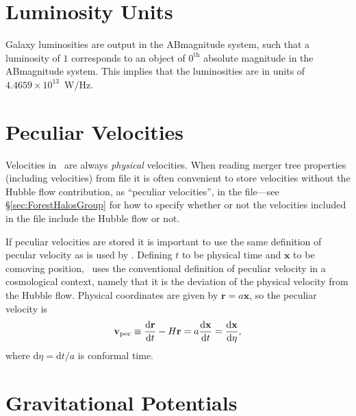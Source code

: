 \section{Luminosity Units}

Galaxy luminosities are output in the \gls{ABmagnitude} system, such that a luminosity of $1$ corresponds to an object of $0^\mathrm{th}$ absolute magnitude in the \gls{ABmagnitude} system. This implies that the luminosities are in units of $4.4659\times 10^{13}$~W/Hz.

\section{Peculiar Velocities}\label{sec:GalacticusVelocityDefinitions}

Velocities in \glc\ are always \emph{physical} velocities. When reading merger tree properties (including velocities) from file it is often convenient to store velocities without the Hubble flow contribution, as ``peculiar velocities'', in the file---see \S\ref{sec:ForestHalosGroup} for how to specify whether or not  the velocities included in the file include the Hubble flow or not.

If peculiar velocities are stored it is important to use the same definition of pecular velocity as is used by \glc. Defining $t$ to be physical time and $\mathbf{x}$ to be comoving position, \glc\ uses the conventional definition of peculiar velocity in a cosmological context, namely that it is the deviation of the physical velocity from the Hubble flow. Physical coordinates are given by $\mathbf{r} = a\mathbf{x}$, so the peculiar velocity is
\begin{equation}
\mathbf{v}_\mathrm{pec} \equiv {\mathrm{d} \mathbf{r} \over \mathrm{d} t} - H \mathbf{r} = a {\mathrm{d} \mathbf{x}\over\mathrm{d} t} = {\mathrm{d}\mathbf{x}\over\mathrm{d}\eta},
\end{equation}
where $\mathrm{d}\eta = \mathrm{d}t/a$ is conformal time. 

\section{Gravitational Potentials}


